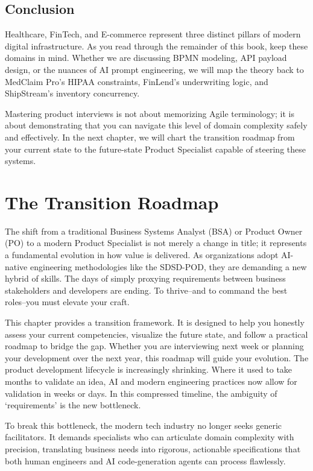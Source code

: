 \documentclass[
  11pt,
  openany,
  oneside]{book}
\begin{document}
\bigskip

\section{Conclusion}\label{conclusion}

Healthcare, FinTech, and E-commerce represent three distinct pillars of
modern digital infrastructure. As you read through the remainder of this
book, keep these domains in mind. Whether we are discussing BPMN
modeling, API payload design, or the nuances of AI prompt engineering,
we will map the theory back to MedClaim Pro's HIPAA constraints,
FinLend's underwriting logic, and ShipStream's inventory concurrency.

Mastering product interviews is not about memorizing Agile terminology;
it is about demonstrating that you can navigate this level of domain
complexity safely and effectively. In the next chapter, we will chart
the transition roadmap from your current state to the future-state
Product Specialist capable of steering these systems.

\chapter{The Transition Roadmap}\label{the-transition-roadmap}

The shift from a traditional Business Systems Analyst (BSA) or Product
Owner (PO) to a modern Product Specialist is not merely a change in
title; it represents a fundamental evolution in how value is delivered.
As organizations adopt AI-native engineering methodologies like the
SDSD-POD, they are demanding a new hybrid of skills. The days of simply
proxying requirements between business stakeholders and developers are
ending. To thrive--and to command the best roles--you must elevate your
craft.

This chapter provides a transition framework. It is designed to help you
honestly assess your current competencies, visualize the future state,
and follow a practical roadmap to bridge the gap. Whether you are
interviewing next week or planning your development over the next year,
this roadmap will guide your evolution. The product development
lifecycle is increasingly shrinking. Where it used to take months to
validate an idea, AI and modern engineering practices now allow for
validation in weeks or days. In this compressed timeline, the ambiguity
of `requirements' is the new bottleneck.

To break this bottleneck, the modern tech industry no longer seeks
generic facilitators. It demands specialists who can articulate domain
complexity with precision, translating business needs into rigorous,
actionable specifications that both human engineers and AI
code-generation agents can process flawlessly.
\end{document}
